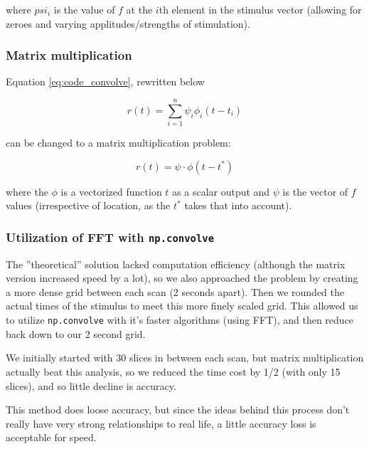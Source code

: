 \documentclass[11pt]{article}
\begin{document}
where $psi_{i}$ is the value of $f$ at the $i$th element in the stimulus vector 
(allowing for zeroes and varying applitudes/strengths of stimulation).


\subsubsection{Matrix multiplication}
Equation \ref{eq:code_convolve}, rewritten below

$$r(t)= \sum_{i=1}^n \psi_i \phi_{i}(t-t_i)$$

can be changed to a matrix multiplication problem:

\begin{equation} \label{eq:matrix_code_convolve}
r(t)=  \psi \cdot \phi(t-t^*)
\end{equation}

where the $\phi$ is a vectorized function $t$ as a scalar output and $\psi$ is the vector of $f$ values (irrespective of location, as the $t^*$ takes that into account).


\subsubsection{Utilization of FFT with \texttt{np.convolve}}
The ''theoretical'' solution lacked computation efficiency (although the matrix version increased speed by a lot), so we also approached the problem by creating a more dense grid between each scan (2 seconds apart). Then we rounded the actual times of the stimulus to meet this more finely scaled grid. This allowed us to utilize \texttt{np.convolve} with it's faster algorithms (using FFT), and then reduce back down to our 2 second grid.

We initially started with 30 slices in between each scan, but matrix multiplication actually beat this analysis, so we reduced the time cost by 1/2 (with only 15 slices), and so little decline is accuracy.

This method does loose accuracy, but since the ideas behind this process don't really have very strong relationships to real life, a little accuracy loss is acceptable for speed.




\end{document}
